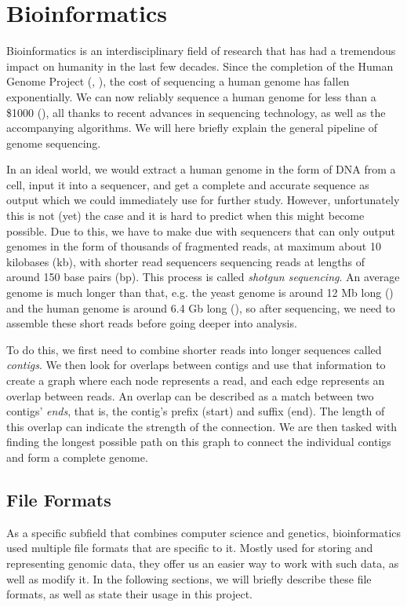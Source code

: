 \documentclass[times, utf8, diplomski, english]{fer_eng}
\begin{document}
\section{Bioinformatics}

Bioinformatics is an interdisciplinary field of research that has had a tremendous impact on humanity in the last few decades. Since the completion of the Human Genome Project (\cite{HGP1}, \cite{HGP2}), the cost of sequencing a human genome has fallen exponentially. We can now reliably sequence a human genome for less than a \$1000 (\cite{genome_cost}), all thanks to recent advances in sequencing technology, as well as the accompanying algorithms. We will here briefly explain the general pipeline of genome sequencing.

In an ideal world, we would extract a human genome in the form of DNA from a cell, input it into a sequencer, and get a complete and accurate sequence as output which we could immediately use for further study. However, unfortunately this is not (yet) the case and it is hard to predict when this might become possible. Due to this, we have to make due with sequencers that can only output genomes in the form of thousands of fragmented reads, at maximum about 10 kilobases (kb), with shorter read sequencers sequencing reads at lengths of around 150 base pairs (bp). This process is called \textit{shotgun sequencing}. An average genome is much longer than that, e.g. the yeast genome is around 12 Mb long (\cite{yeast}) and the human genome is around 6.4 Gb long (\cite{human}), so after sequencing, we need to assemble these short reads before going deeper into analysis.

To do this, we first need to combine shorter reads into longer sequences called \textit{contigs}. We then look for overlaps between contigs and use that information to create a graph where each node represents a read, and each edge represents an overlap between reads. An overlap can be described as a match between two contigs' \textit{ends}, that is, the contig's prefix (start) and suffix (end). The length of this overlap can indicate the strength of the connection. We are then tasked with finding the longest possible path on this graph to connect the individual contigs and form a complete genome.

\subsection{File Formats}

As a specific subfield that combines computer science and genetics, bioinformatics used multiple file formats that are specific to it. Mostly used for storing and representing genomic data, they offer us an easier way to work with such data, as well as modify it. In the following sections, we will briefly describe these file formats, as well as state their usage in this project.
\end{document}
